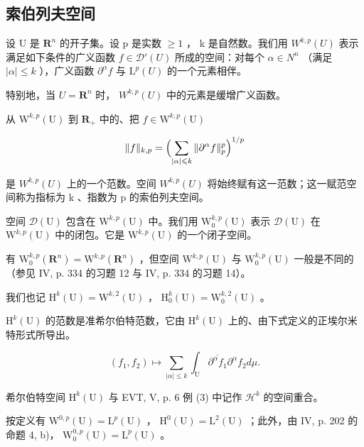 \subsection{索伯列夫空间}

设 U 是 \(\mathbf{R}^{n} \) 的开子集。设 p 是实数 \(\geqslant 1\) ， k 是自然数。我们用 \(W^{k,p}(U)\) 表示满足如下条件的广义函数 \(f \in \mathcal{D}'(U)\) 所成的空间：对每个 \(\alpha \in N^{n}\) （满足 \(|\alpha| \leqslant k\) ），广义函数 \(\partial^{\alpha}f\) 与 \(\mathrm{L}^{p}(U) \) 的一个元素相伴。

特别地，当 \(U = \mathbf{R}^{n}\) 时， \(W^{k,p}(U)\) 中的元素是缓增广义函数。

从 \(\mathrm{W}^{k,p}(\mathrm{U})\) 到 \(\mathbf{R}_{+}\) 中的、把 \(f\in \mathrm{W}^{k,p}(\mathrm{U})\)

\[
\| f \| _ {k, p} = \Bigl (\sum_ {| \alpha | \leqslant k} \| \partial^ {\alpha} f \| _ {p} ^ {p} \Bigr) ^ {1 / p}
\]

是 \(W^{k,p}(U)\) 上的一个范数。空间 \(W^{k,p}(U)\) 将始终赋有这一范数；这一赋范空间称为指标为 k 、指数为 p 的索伯列夫空间。

空间 \(\mathcal{D}(\mathrm{U})\) 包含在 \(\mathrm{W}^{k,p}(\mathrm{U})\) 中。我们用 \(\mathrm{W}_0^{k,p}(\mathrm{U})\) 表示 \(\mathcal{D}(\mathrm{U})\) 在 \(\mathrm{W}^{k,p}(\mathrm{U})\) 中的闭包。它是 \(\mathrm{W}^{k,p}(\mathrm{U})\) 的一个闭子空间。

有 \(\mathrm{W}_{0}^{k,p}(\mathbf{R}^{n})=\mathrm{W}^{k,p}(\mathbf{R}^{n})\) ，但空间 \(\mathrm{W}^{k,p}(\mathrm{U})\) 与 \(\mathrm{W}_{0}^{k,p}(\mathrm{U})\) 一般是不同的（参见 IV, p. 334 的习题 12 与 IV, p. 334 的习题 14）。

我们也记 \(\mathrm{H}^k (\mathrm{U}) = \mathrm{W}^{k,2}(\mathrm{U})\) ， \(\mathrm{H}_0^k (\mathrm{U}) = \mathrm{W}_0^{k,2}(\mathrm{U})\) 。

 \(\mathrm{H}^{k}(\mathrm{U})\) 的范数是准希尔伯特范数，它由 \(\mathrm{H}^{k}(\mathrm{U})\) 上的、由下式定义的正埃尔米特形式所导出。

\[
\left(f _ {1}, f _ {2}\right) \mapsto \sum_ {| \alpha | \leqslant k} \int_ {\mathrm{U}} \overline {{\partial^ {\alpha} f _ {1}}} \partial^ {\alpha} f _ {2} d \mu .
\]

希尔伯特空间 \(\mathrm{H}^k (\mathrm{U})\) 与 EVT, V, p. 6 例 (3) 中记作 \(\mathcal{H}^k\) 的空间重合。

按定义有 \(\mathrm{W}^{0,p}(\mathrm{U})=\mathrm{L}^{p}(\mathrm{U})\) ， \(\mathrm{H}^{0}(\mathrm{U})=\mathrm{L}^{2}(\mathrm{U})\) ；此外，由 IV, p. 202 的命题 4, b)， \(\mathrm{W}_{0}^{0,p}(\mathrm{U})=\mathrm{L}^{p}(\mathrm{U})\) 。

